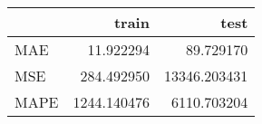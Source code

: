 \begin{tabular}{lrr}
\toprule
{} &        train &          test \\
\midrule
MAE  &    11.922294 &     89.729170 \\
MSE  &   284.492950 &  13346.203431 \\
MAPE &  1244.140476 &   6110.703204 \\
\bottomrule
\end{tabular}
